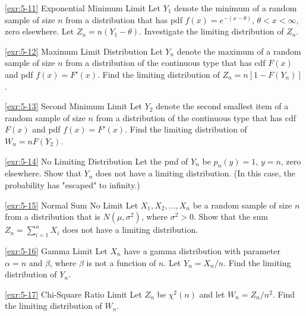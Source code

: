 \begin{exercise}{\ref{exr:5-11} Exponential Minimum Limit}\label{exr:5-11}
Let $Y_1$ denote the minimum of a random sample of size $n$ from a distribution that has pdf $f(x) = e^{-(x-\theta)}$, $\theta < x < \infty$, zero elsewhere. Let $Z_n = n(Y_1 - \theta)$. Investigate the limiting distribution of $Z_n$.
\end{exercise}

\begin{exercise}{\ref{exr:5-12} Maximum Limit Distribution}\label{exr:5-12}
Let $Y_n$ denote the maximum of a random sample of size $n$ from a distribution of the continuous type that has cdf $F(x)$ and pdf $f(x) = F'(x)$. Find the limiting distribution of $Z_n = n[1 - F(Y_n)]$.
\end{exercise}

\begin{exercise}{\ref{exr:5-13} Second Minimum Limit}\label{exr:5-13}
Let $Y_2$ denote the second smallest item of a random sample of size $n$ from a distribution of the continuous type that has cdf $F(x)$ and pdf $f(x) = F'(x)$. Find the limiting distribution of $W_n = nF(Y_2)$.
\end{exercise}

\begin{exercise}{\ref{exr:5-14} No Limiting Distribution}\label{exr:5-14}
Let the pmf of $Y_n$ be $p_n(y) = 1$, $y = n$, zero elsewhere. Show that $Y_n$ does not have a limiting distribution. (In this case, the probability has "escaped" to infinity.)
\end{exercise}

\begin{exercise}{\ref{exr:5-15} Normal Sum No Limit}\label{exr:5-15}
Let $X_1, X_2, \ldots, X_n$ be a random sample of size $n$ from a distribution that is $N(\mu, \sigma^2)$, where $\sigma^2 > 0$. Show that the sum $Z_n = \sum_{i=1}^n X_i$ does not have a limiting distribution.
\end{exercise}

\begin{exercise}{\ref{exr:5-16} Gamma Limit}\label{exr:5-16}
Let $X_n$ have a gamma distribution with parameter $\alpha = n$ and $\beta$, where $\beta$ is not a function of $n$. Let $Y_n = X_n/n$. Find the limiting distribution of $Y_n$.
\end{exercise}

\begin{exercise}{\ref{exr:5-17} Chi-Square Ratio Limit}\label{exr:5-17}
Let $Z_n$ be $\chi^2(n)$ and let $W_n = Z_n/n^2$. Find the limiting distribution of $W_n$.
\end{exercise}

